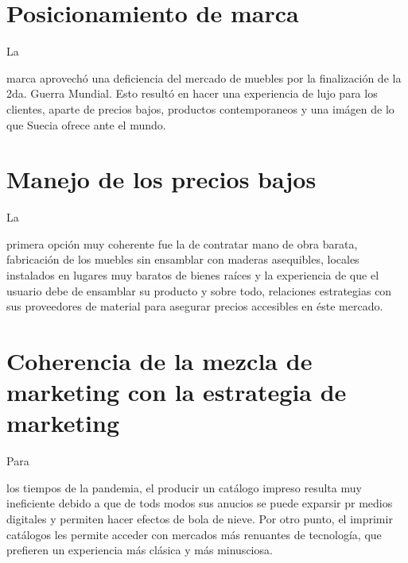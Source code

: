 \documentclass[stu, 12pt, letterpaper, donotrepeattitle, floatsintext, natbib]{apa7}
\begin{document}
\section{Posicionamiento de marca}
La \begin{justifying}
    marca aprovechó una deficiencia del mercado de muebles por la finalización de la 2da. Guerra Mundial. Esto resultó
en hacer una experiencia de lujo para los clientes, aparte de precios bajos, productos contemporaneos y una imágen de lo que
Suecia ofrece ante el mundo.\par
\end{justifying}
\vspace{\baselineskip}
\section{Manejo de los precios bajos}
La \begin{justifying}
    primera opción muy coherente fue la de contratar mano de obra barata, fabricación de los muebles sin ensamblar
con maderas asequibles, locales instalados en lugares muy baratos de bienes raíces y la experiencia de que el usuario debe de ensamblar su producto y sobre todo, relaciones estrategias
con sus proveedores de material para asegurar precios accesibles en éste mercado.\par
\end{justifying}
\vspace{\baselineskip}
\section{Coherencia de la mezcla de marketing con la estrategia de marketing}
Para \begin{justifying}
    los tiempos de la pandemia, el producir un catálogo impreso resulta muy ineficiente debido a que de tods modos sus anucios se puede exparsir
pr medios digitales y permiten hacer efectos de bola de nieve. Por otro punto, el imprimir catálogos les permite
acceder con mercados más renuantes de tecnología, que prefieren un experiencia más clásica y más minusciosa.\par
\end{justifying}
\end{document}
